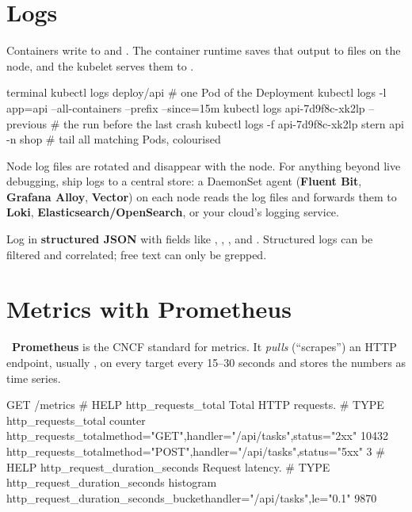 \section{Logs}

Containers write to  and . The container runtime saves
that output to files on the node, and the kubelet serves them to
.

\begin{bashcode}{terminal}
kubectl logs deploy/api                     # one Pod of the Deployment
kubectl logs -l app=api --all-containers --prefix --since=15m
kubectl logs api-7d9f8c-xk2lp --previous    # the run before the last crash
kubectl logs -f api-7d9f8c-xk2lp
stern api -n shop                           # tail all matching Pods, colourised
\end{bashcode}

\begin{warningbox}
Node log files are rotated and disappear with the node. For anything beyond
live debugging, ship logs to a central store: a DaemonSet agent
(\textbf{Fluent Bit}, \textbf{Grafana Alloy}, \textbf{Vector}) on each node reads
the log files and forwards them to \textbf{Loki}, \textbf{Elasticsearch/OpenSearch},
or your cloud's logging service.
\end{warningbox}

\begin{protip}
Log in \textbf{structured JSON} with fields like , ,
, and . Structured logs can be filtered and
correlated; free text can only be grepped.
\end{protip}

\section{Metrics with Prometheus}

~\textbf{Prometheus} is the CNCF standard for metrics. It
\emph{pulls} (``scrapes'') an HTTP endpoint, usually , on every
target every 15--30 seconds and stores the numbers as time series.

\begin{plaincode}{GET /metrics}
# HELP http_requests_total Total HTTP requests.
# TYPE http_requests_total counter
http_requests_total{method="GET",handler="/api/tasks",status="2xx"} 10432
http_requests_total{method="POST",handler="/api/tasks",status="5xx"} 3
# HELP http_request_duration_seconds Request latency.
# TYPE http_request_duration_seconds histogram
http_request_duration_seconds_bucket{handler="/api/tasks",le="0.1"} 9870
\end{plaincode}

